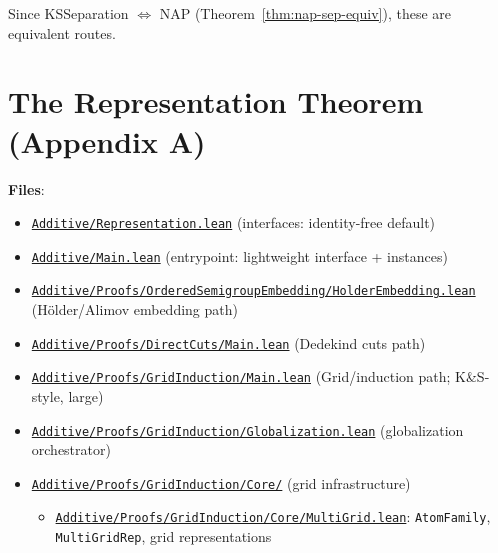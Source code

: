 \documentclass[11pt]{article}
\theoremstyle{definition}
\theoremstyle{remark}
\begin{document}
Since KSSeparation $\Leftrightarrow$ NAP (Theorem~\ref{thm:nap-sep-equiv}), these are equivalent routes.

\section{The Representation Theorem (Appendix A)}

\textbf{Files}:
\begin{itemize}
\item \href{https://github.com/zariuq/ks-foundations-of-inference/blob/main/KnuthSkilling/Additive/Representation.lean}{\texttt{Additive/Representation.lean}} (interfaces: identity-free default)
\item \href{https://github.com/zariuq/ks-foundations-of-inference/blob/main/KnuthSkilling/Additive/Main.lean}{\texttt{Additive/Main.lean}} (entrypoint: lightweight interface + instances)
\item {\scriptsize\href{https://github.com/zariuq/ks-foundations-of-inference/blob/main/KnuthSkilling/Additive/Proofs/OrderedSemigroupEmbedding/HolderEmbedding.lean}{\texttt{Additive/Proofs/OrderedSemigroupEmbedding/HolderEmbedding.lean}}} (Hölder/Alimov embedding path)
\item \href{https://github.com/zariuq/ks-foundations-of-inference/blob/main/KnuthSkilling/Additive/Proofs/DirectCuts/Main.lean}{\texttt{Additive/Proofs/DirectCuts/Main.lean}} (Dedekind cuts path)
\item \href{https://github.com/zariuq/ks-foundations-of-inference/blob/main/KnuthSkilling/Additive/Proofs/GridInduction/Main.lean}{\texttt{Additive/Proofs/GridInduction/Main.lean}} (Grid/induction path; K\&S-style, large)
\item \href{https://github.com/zariuq/ks-foundations-of-inference/blob/main/KnuthSkilling/Additive/Proofs/GridInduction/Globalization.lean}{\texttt{Additive/Proofs/GridInduction/Globalization.lean}} (globalization orchestrator)
\item \href{https://github.com/zariuq/ks-foundations-of-inference/tree/main/KnuthSkilling/Additive/Proofs/GridInduction/Core/}{\texttt{Additive/Proofs/GridInduction/Core/}} (grid infrastructure)
  \begin{itemize}
  \item \href{https://github.com/zariuq/ks-foundations-of-inference/blob/main/KnuthSkilling/Additive/Proofs/GridInduction/Core/MultiGrid.lean}{\texttt{Additive/Proofs/GridInduction/Core/MultiGrid.lean}}: \texttt{AtomFamily}, \texttt{MultiGridRep}, grid representations

\end{itemize}
\end{itemize}
\end{document}
